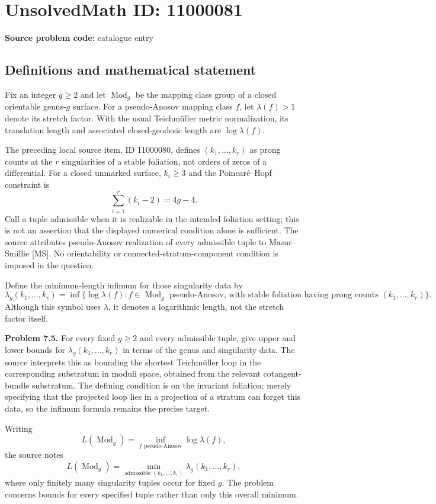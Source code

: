 \documentclass[11pt]{article}
\begin{document}
\section*{UnsolvedMath ID: 11000081}
\textbf{Source problem code:} catalogue entry
\subsection{Definitions and mathematical statement}
Fix an integer $g\ge2$ and let $\operatorname{Mod}_g$ be the mapping class group of a closed orientable genus-$g$ surface. For a pseudo-Anosov mapping class $f$, let $\lambda(f)>1$ denote its stretch factor. With the usual Teichm\"uller metric normalization, its translation length and associated closed-geodesic length are $\log\lambda(f)$.

The preceding local source item, ID 11000080, defines $(k_1,\ldots,k_r)$ as prong counts at the $r$ singularities of a stable foliation, not orders of zeros of a differential. For a closed unmarked surface, $k_i\ge3$ and the Poincar\'e--Hopf constraint is
\[
 \sum_{i=1}^r(k_i-2)=4g-4.
\]
Call a tuple admissible when it is realizable in the intended foliation setting; this is not an assertion that the displayed numerical condition alone is sufficient. The source attributes pseudo-Anosov realization of every admissible tuple to Masur--Smillie [MS]. No orientability or connected-stratum-component condition is imposed in the question.

Define the minimum-length infimum for those singularity data by
\[
 \lambda_g(k_1,\ldots,k_r)=
 \inf\{\log\lambda(f):f\in\operatorname{Mod}_g\text{ pseudo-Anosov, with stable foliation having prong counts }(k_1,\ldots,k_r)\}.
\]
Although this symbol uses $\lambda$, it denotes a logarithmic length, not the stretch factor itself.

\textbf{Problem 7.5.} For every fixed $g\ge2$ and every admissible tuple, give upper and lower bounds for $\lambda_g(k_1,\ldots,k_r)$ in terms of the genus and singularity data. The source interprets this as bounding the shortest Teichm\"uller loop in the corresponding substratum in moduli space, obtained from the relevant cotangent-bundle substratum. The defining condition is on the invariant foliation; merely specifying that the projected loop lies in a projection of a stratum can forget this data, so the infimum formula remains the precise target.

Writing
\[
 L(\operatorname{Mod}_g)=\inf_{f\text{ pseudo-Anosov}}\log\lambda(f),
\]
the source notes
\[
 L(\operatorname{Mod}_g)=\min_{\text{admissible }(k_1,\ldots,k_r)}
 \lambda_g(k_1,\ldots,k_r),
\]
where only finitely many singularity tuples occur for fixed $g$. The problem concerns bounds for every specified tuple rather than only this overall minimum.
\end{document}
